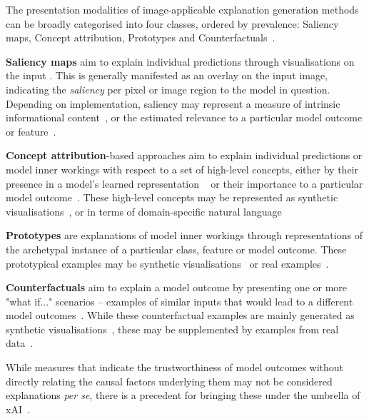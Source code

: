 \documentclass[final,5p,times,twocolumn,hyphens]{elsarticle}
\begin{document}
The presentation modalities of image-applicable explanation generation methods can be broadly categorised into four classes, ordered by prevalence: Saliency maps, Concept attribution, Prototypes and Counterfactuals~\cite{bodria_benchmarking_2021}.

\textbf{Saliency maps} aim to explain individual predictions through visualisations on the input \cite{MorchEtAl:1995:Saliency}. This is generally manifested as an overlay on the input image, indicating the \textit{saliency} per pixel or image region to the model in question. Depending on implementation, saliency may represent a measure of intrinsic informational content~\cite{KadirBrady:2001:Saliency}, or the estimated relevance to a particular model outcome or feature~\cite{SimonyanVedaldiZisserman:2013:DeepInside, springenberg2014striving, yosinski2015deepvisualization, LapuschkinEtAl:2016:LRP, selvaraju2017grad, ribeiro2018anchors}.

\textbf{Concept attribution}-based approaches aim to explain individual predictions or model inner workings with respect to a set of high-level concepts, either by their presence in a model's learned representation ~\cite{GrazianiHenning:2020:ConceptAttribution} or their importance to a particular model outcome~\cite{kim2018interpretability}. These high-level concepts may be represented as synthetic visualisations~\cite{erhan2009visualizing, yosinski2015deepvisualization}, or in terms of domain-specific natural language~\cite{GrazianiHenning:2020:ConceptAttribution, kim2018interpretability} 

\textbf{Prototypes} are explanations of model inner workings through representations of the archetypal instance of a particular class, feature or model outcome. These prototypical examples may be synthetic visualisations~\cite{li2018deep} or real examples~\cite{kim2016examples}.

\textbf{Counterfactuals} aim to explain a model outcome by presenting one or more "what if..." scenarios -- examples of similar inputs that would lead to a different model outcomes~\cite{ginsberg1986counterfactuals}. While these counterfactual examples are mainly generated as synthetic visualisations~\cite{seah2019chest, poceviciute_survey_2020, liu2019generative}, these may be supplemented by examples from real data~\cite{gulshad2021counterfactual}.

While measures that indicate the trustworthiness of model outcomes without directly relating the causal factors underlying them may not be considered explanations \textit{per se}, there is a precedent for bringing these under the umbrella of xAI~\cite{poceviciute_survey_2020, lin2019explanations}.
\end{document}
